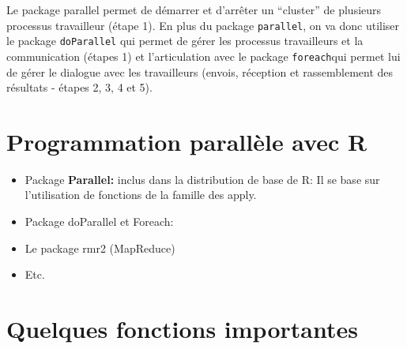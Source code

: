 \documentclass[
]{article}
\begin{document}
Le package parallel permet de démarrer et d'arrêter un ``cluster'' de
plusieurs processus travailleur (étape 1). En plus du package
\texttt{parallel}, on va donc utiliser le package \texttt{doParallel}
qui permet de gérer les processus travailleurs et la communication
(étapes 1) et l'articulation avec le package \texttt{foreach}qui permet
lui de gérer le dialogue avec les travailleurs (envois, réception et
rassemblement des résultats - étapes 2, 3, 4 et 5).

\hypertarget{programmation-paralluxe8le-avec-r}{%
\section{Programmation parallèle avec
R}\label{programmation-paralluxe8le-avec-r}}

\begin{itemize}
\item
  Package \textbf{Parallel:} inclus dans la distribution de base de R:
  Il se base sur l'utilisation de fonctions de la famille des apply.
\item
  Package doParallel et Foreach:
\item
  Le package rmr2 (MapReduce)
\item
  Etc.
\end{itemize}

\hypertarget{quelques-fonctions-importantes}{%
\section{Quelques fonctions
importantes}\label{quelques-fonctions-importantes}}
\end{document}
